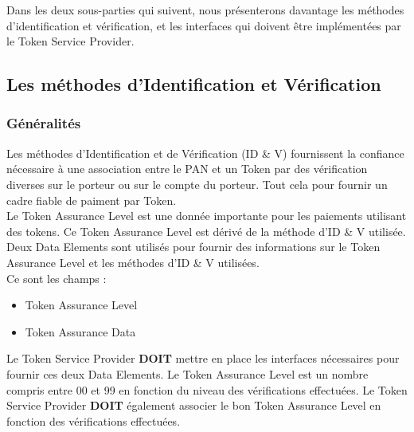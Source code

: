 \documentclass{report}
\begin{document}
Dans les deux sous-parties qui suivent, nous présenterons davantage les méthodes d'identification et vérification, et les interfaces qui doivent être implémentées par le Token Service Provider.

\subsection{Les méthodes d'Identification et Vérification}

\subsubsection{Généralités}
Les méthodes d'Identification et de Vérification (ID \& V) fournissent la confiance nécessaire à une association entre le PAN et un Token par des vérification diverses sur le porteur ou sur le compte du porteur. Tout cela pour fournir un cadre fiable de paiment par Token. \\
Le Token Assurance Level est une donnée importante pour les paiements utilisant des tokens. Ce Token Assurance Level est dérivé de la méthode d'ID \& V utilisée.
Deux Data Elements sont utilisés pour fournir des informations sur le Token Assurance Level et les méthodes d'ID \& V utilisées.\\
Ce sont les champs : 
\begin{itemize}
	\item Token Assurance Level
	\item Token Assurance Data\\
\end{itemize}

Le Token Service Provider \textbf{DOIT} mettre en place les interfaces nécessaires pour fournir ces deux Data Elements.
Le Token Assurance Level est un nombre compris entre 00 et 99 en fonction du niveau des vérifications effectuées. Le Token Service Provider \textbf{DOIT} également associer le bon Token Assurance Level en fonction des vérifications effectuées.
\end{document}
